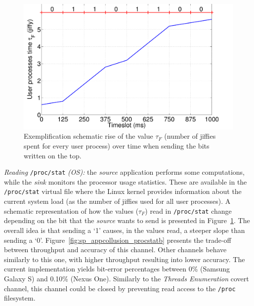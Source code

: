 \begin{figure}[!ht]
  \centering
  \includegraphics[width=.8\linewidth]{figures/securingphone/channels_p1}
  \caption[Schematic rise of the value $\tau_F$ over time]{Exemplification schematic rise
  of the value $\tau_F$ (number of jiffies spent for every user process) over time when
  sending the bits written on the top.}
  \label{fig:sp_appcollusion_procstata}
\end{figure}

\noindent \emph{Reading} \texttt{/proc/stat} \emph{(OS):} the
\emph{source} application performs some computations, while the
\emph{sink} monitors the processor usage statistics. These are
available in the \texttt{/proc/stat} virtual file where the Linux
kernel provides information about the current system load (as the
number of jiffies used for all user processes). A schematic
representation of how the values ($\tau_F$) read in
\texttt{/proc/stat} change depending on the bit that the \emph{source}
wants to send is presented in Figure~\ref{fig:sp_appcollusion_procstata}. The overall
idea is that sending a `1' causes, in the values read, a steeper slope
than sending a `0'. Figure~\ref{fig:sp_appcollusion_procstatb} presents the trade-off
between throughput and accuracy of this channel. Other channels behave
similarly to this one, with higher throughput resulting into lower
accuracy. The current implementation yields bit-error percentages
between 0\% (Samsung Galaxy S) and 0.10\% (Nexus One). Similarly to
the \emph{Threads Enumeration} covert channel, this channel could be
closed by preventing read access to the \texttt{/proc} filesystem.

